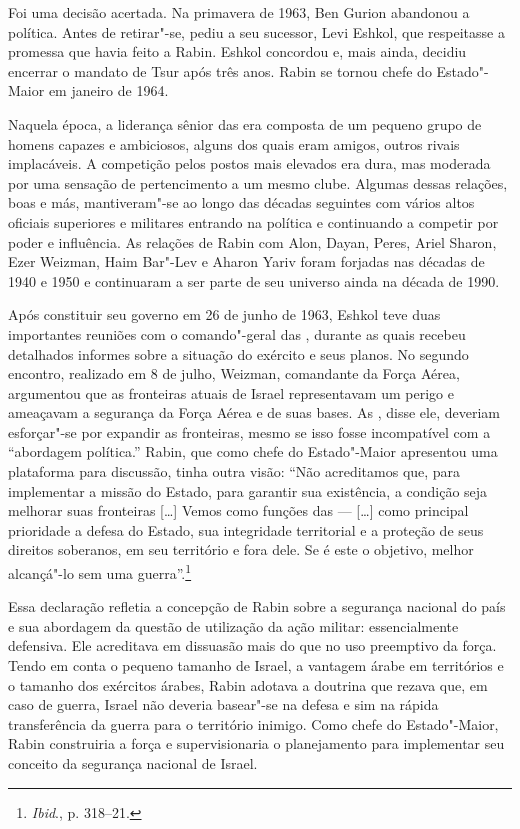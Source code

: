 Foi uma decisão acertada. Na primavera de 1963, Ben Gurion abandonou a
política. Antes de retirar"-se, pediu a seu sucessor, Levi Eshkol, que
respeitasse a promessa que havia feito a Rabin. Eshkol concordou e,
mais ainda, decidiu encerrar o mandato de Tsur após três anos.
Rabin se tornou chefe do Estado"-Maior em janeiro de 1964.

Naquela época, a liderança sênior das  era composta de um pequeno
grupo de homens capazes e ambiciosos, alguns dos quais eram amigos,
outros rivais implacáveis. A competição pelos postos mais elevados era
dura, mas moderada por uma sensação de pertencimento a um mesmo clube.
Algumas dessas relações, boas e más, mantiveram"-se ao longo das décadas
seguintes com vários altos oficiais superiores e militares entrando na
política e continuando a competir por poder e influência. As relações de
Rabin com Alon, Dayan, Peres, Ariel Sharon, Ezer Weizman, Haim Bar"-Lev e
Aharon Yariv foram forjadas nas décadas de 1940 e 1950 e continuaram a
ser parte de seu universo ainda na década de 1990.

Após constituir seu governo em 26 de junho de 1963, Eshkol teve duas
importantes reuniões com o comando"-geral das , durante as quais
recebeu detalhados informes sobre a situação do exército e seus planos.
No segundo encontro, realizado em 8 de julho, Weizman, comandante da
Força Aérea, argumentou que as fronteiras atuais de Israel representavam
um perigo e ameaçavam a segurança da Força Aérea e de suas bases. As
, disse ele, deveriam esforçar"-se por expandir as fronteiras, mesmo
se isso fosse incompatível com a ``abordagem política.'' Rabin, que como
chefe do Estado"-Maior apresentou uma plataforma para discussão, tinha
outra visão: ``Não acreditamos que, para implementar a missão do Estado,
para garantir sua existência, a condição seja melhorar suas fronteiras
{[}\ldots{}{]} Vemos como funções das  --- {[}\ldots{}{]} como principal prioridade a defesa do
Estado, sua integridade territorial e a proteção de seus direitos
soberanos, em seu território e fora dele. Se é este o objetivo, melhor
alcançá"-lo sem uma guerra''.\footnote{\emph{Ibid}., p. 318--21.}

Essa declaração refletia a concepção de Rabin sobre a segurança nacional do
país e sua abordagem da questão de utilização da ação militar:
essencialmente defensiva. Ele acreditava em dissuasão mais do que no uso
preemptivo da força. Tendo em conta o pequeno tamanho de Israel, a
vantagem árabe em territórios e o tamanho dos exércitos árabes, Rabin
adotava a doutrina que rezava que, em caso de guerra, Israel não deveria
basear"-se na defesa e sim na rápida transferência da guerra para o
território inimigo. Como chefe do Estado"-Maior, Rabin construiria a
força e supervisionaria o planejamento para implementar seu conceito da
segurança nacional de Israel.

